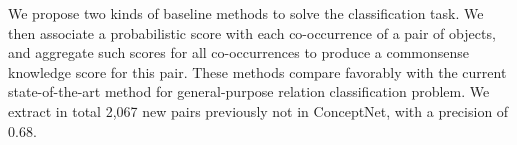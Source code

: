 %
%
%


We propose two kinds of baseline methods to solve the classification task.
We then associate a probabilistic score with each co-occurrence of
a pair of objects, and aggregate such scores for all co-occurrences
to produce a commonsense knowledge score for this pair.  
These methods compare favorably with the current state-of-the-art
	method for general-purpose relation classification problem.
We extract in total 2,067 new pairs previously not in
	ConceptNet, with a precision of 0.68. 


